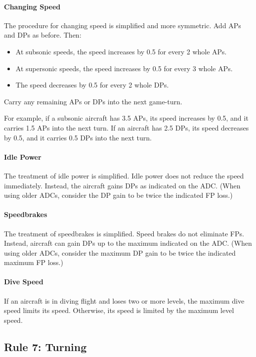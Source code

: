 \documentclass[10pt]{article}
\begin{document}
\paragraph{Changing Speed} The procedure for changing speed is simplified and more symmetric. Add APs and DPs as before. Then: 
\begin{itemize}
    \item At subsonic speeds, the speed increases by 0.5 for every 2 whole APs. 
    \item At supersonic speeds, the speed increases by 0.5 for every 3 whole APs. 
    \item The speed decreases by 0.5 for every 2 whole DPs.
\end{itemize}
Carry any remaining APs or DPs into the next game-turn. 

For example, if a subsonic aircraft has 3.5 APs, its speed increases by 0.5, and it carries 1.5 APs into the next turn. If an aircraft has 2.5 DPs, its speed decreases by 0.5, and it carries 0.5 DPs into the next turn.

\paragraph{Idle Power} The treatment of idle power is simplified. Idle power does not reduce the speed immediately. Instead, the aircraft gains DPs as indicated on the ADC. (When using older ADCs, consider the DP gain to be twice the indicated FP loss.)

\paragraph{Speedbrakes} The treatment of speedbrakes is simplified. Speed brakes do not eliminate FPs. Instead, aircraft can gain DPs up to the maximum indicated on the ADC. (When using older ADCs, consider the maximum DP gain to be twice the indicated maximum FP loss.)

\paragraph{Dive Speed} If an aircraft is in diving flight and loses two or more levels, the maximum dive speed limits its speed. Otherwise, its speed is limited by the maximum level speed.

\subsection{Rule 7: Turning}
\end{document}
